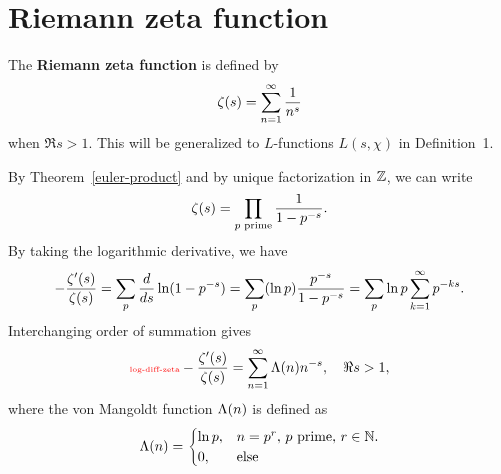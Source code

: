 \section{Riemann zeta function}
\begin{df}
The \textbf{Riemann zeta function} is defined by %
\[
\zeta(s)=\sum_{n=1}^{\infty} \frac{1}{n^s}
\]
when $\Re s>1$. This will be generalized to $L$-functions $L(s,\chi)$ in Definition~1.
\end{df}
By Theorem~\ref{euler-product} and by unique factorization in $\mathbb{Z}$, we can write
\[
\zeta(s)=\prod_{p\text{ prime}}\frac{1}{1-p^{-s}}.
\]
By taking the logarithmic derivative, we have %
\[
-\frac{\zeta'(s)}{\zeta(s)}=\sum_p \frac{d}{ds}\ln(1-p^{-s})
=\sum_p (\ln p)\frac{p^{-s}}{1-p^{-s}}=\sum_p \ln p\sum_{k=1}^{\infty} p^{-ks}.
\]
Interchanging order of summation gives
\begin{equation}\llabel{log-diff-zeta}
-\frac{\zeta'(s)}{\zeta(s)}=\sum_{n=1}^{\iy} \La(n)n^{-s}, \quad \Re s>1,
\end{equation}
where the von Mangoldt function $\Lambda(n)$ is defined as
\[
\Lambda(n)=\begin{cases}
\ln p,&n=p^r,\,p\text{ prime, }r\in \mathbb{N}.\\
0,&\text{else}
\end{cases}
\]

